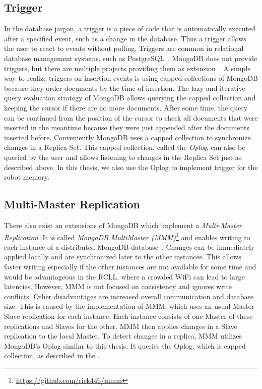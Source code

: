\subsection{Trigger}
\label{sec:mongodb-trigger}
In the database jargon, a trigger is a piece of code that is
automatically executed after a specified event, such as a change in
the database. Thus a trigger allows the user to react to events
without polling. Triggers are common in relational database management
systems, such as PostgreSQL~\cite{postgresql}. MongoDB does not
provide triggers, but there are multiple projects providing them as
extension~\cite{mongodb-trigger}. A simple way to realize
triggers on insertion events is using capped collections of MongoDB
because they order documents by the time of
insertion. The lazy and
iterative query evaluation strategy of MongoDB allows querying the
capped collection and keeping the cursor if there are no more
documents. After some time, the query can be continued from the
position of the cursor to check all documents that were inserted in the
meantime because they were just appended after the documents inserted
before. Conveniently MongoDB uses a capped collection to synchronize
changes in a Replica Set. This capped collection, called the
\emph{Oplog}, can also be queried by the user and allows listening to
changes in the Replica Set just as described above. In this thesis, we
also use the Oplog to implement trigger for the robot memory.

\subsection{Multi-Master Replication}
\label{sec:mongodb-multi-master}
There also exist an extensions of MongoDB which implement a
\emph{Multi-Master Replication}. It is called \emph{MongoDB
  MultiMaster (MMM)}\footnote{\url{https://github.com/rick446/mmm}}
and enables writing to each instance of a distributed MongoDB
database~\cite{mongodb-multi-master}. Changes can be immediately
applied locally and are synchronized later to the other
instances. This allows faster writing especially if the other
instances are not available for some time and would be advantageous in
the RCLL, where a crowded WiFi can lead to large latencies. However,
MMM is not focused on consistency and ignores write conflicts. Other
disadvantages are increased overall communication and database
size. This is caused by the implementation of MMM, which uses an usual
Master-Slave replication for each instance. Each instance consists of
one Master of these replications and Slaves for the other. MMM then
applies changes in a Slave replication to the local Master.  To detect
changes in a replica, MMM utilizes MongoDB's Oplog similar to this
thesis. It queries the Oplog, which is capped collection, as described
in the .

